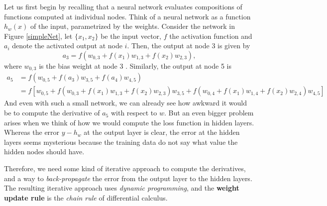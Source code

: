 \documentclass{tufte-handout}
\begin{document}
  Let us first begin by recalling that a neural network evaluates compositions of functions computed at individual nodes. Think of a neural network as a function $h_w(x)$ of the input, parametrized by the weights. Consider the network in Figure \ref{simpleNet}, let $\{x_1,x_2\}$ be the input vector, $f$ the activation function and $a_i$ denote the activated output at node $i$. Then, the output at node 3 is given by
  $$a_3 = f(w_{0, 3} + f(x_1)w_{1,3} + f(x_2)w_{2,3}), $$
  where $w_{0,3}$ is the bias weight at node 3 . Similarly, the output at node 5 is
  \begin{equation*}
    \begin{split}
      a_5 &= f( w_{0,5} + f(a_3) w_{3,5} + f(a_4) w_{4,5}  )\\ 
      &= f[w_{0,5} + f(w_{0, 3} + f(x_1)w_{1,3} + f(x_2)w_{2,3})w_{3,5} +f(w_{0, 4} + f(x_1)w_{1,4} + f(x_2)w_{2,4})w_{4,5} ]
    \end{split}
  \end{equation*}
  And even with such a small network, we can already see how awkward it would be to compute the derivative of $a_5$ with respect to $w$. But an even bigger problem arises when we think of how we would compute the loss function in hidden layers. Whereas the error $y -h_w$ at the output layer is clear, the error at the hidden layers seems mysterious because the training data do not say what value the hidden nodes should have.

  Therefore, we need some kind of iterative approach to compute the derivatives, and a way to \textit{back-propagate} the error from the output layer to the hidden layers. The resulting iterative approach uses \textit{dynamic programming}, and the \textbf{weight update rule} is the \textit{chain rule} of differential calculus\cite{inbook:Aggarwal-3.2}.
\end{document}
